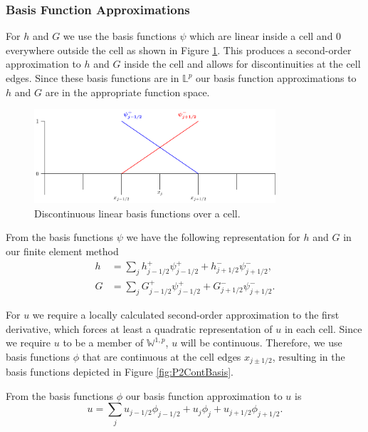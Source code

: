 \subsubsection{Basis Function Approximations}
For $h$ and $G$ we use the basis functions $\psi$ which are linear inside a cell and $0$ everywhere outside the cell as shown in Figure \ref{fig:P1DiscBasis}. This produces a second-order approximation to $h$ and $G$ inside the cell and allows for discontinuities at the cell edges. Since these basis functions are in $\mathbb{L}^p$ our basis function approximations to $h$ and $G$ are in the appropriate function space.

\begin{figure}
	\centering
	\includegraphics[width=0.8\textwidth]{./chp3/figures/P1.pdf}
	\caption{Discontinuous linear basis functions over a cell.}
	\label{fig:P1DiscBasis}
\end{figure}
From the basis functions $\psi$ we have the following representation for $h$ and $G$ in our finite element method
\begin{subequations}
\begin{align}
\label{eqn:FEapproxtoh}
h &= \sum_j h^+_{j-1/2}\psi^+_{j-1/2}  + h^-_{j+1/2}\psi^-_{j+1/2}, \\
G &= \sum_j G^+_{j-1/2}\psi^+_{j-1/2}  + G^-_{j+1/2}\psi^-_{j+1/2}.
\label{eqn:FEapproxtoG}
\end{align}
\label{eqn:FEapproxtohG}
\end{subequations}


For $u$ we require a locally calculated second-order approximation to the first derivative, which forces at least a quadratic representation of $u$ in each cell. Since we require $u$ to be a member of $\mathbb{W}^{1,p}$, $u$ will be continuous. Therefore, we use basis functions $\phi$ that are continuous at the cell edges $x_{j \pm 1/2}$, resulting in the basis functions depicted in Figure \ref{fig:P2ContBasis}.

From the basis functions $\phi$ our basis function approximation to $u$ is
\begin{equation}
u = \sum_j u_{j-1/2}\phi_{j-1/2} + u_{j}\phi_{j} + u_{j+1/2}\phi_{j+1/2}.
\label{eqn:FEapproxtou}
\end{equation}

